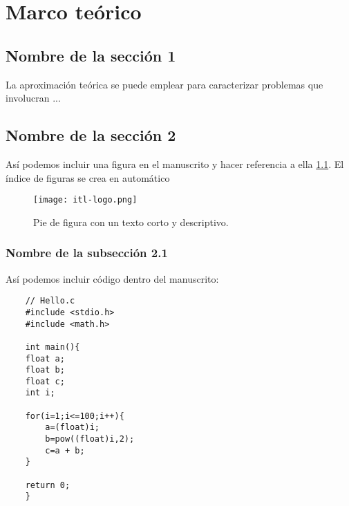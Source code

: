 \chapter{Marco teórico}

\section{Nombre de la sección 1}
La aproximación teórica \cite{Bloomfield1935} se puede emplear para caracterizar problemas que involucran \cite{Traugott1990}...

\section{Nombre de la sección 2}
Así podemos incluir una figura en el manuscrito y hacer referencia a ella \ref{Fig:01}. El índice de figuras se crea en automático

\begin{figure}[htp!]
	\centering
	\texttt{[image: itl-logo.png]}
	\caption{Pie de figura con un texto corto y descriptivo.}
	\label{Fig:01}
\end{figure}

\subsection{Nombre de la subsección 2.1}
Así podemos incluir código dentro del manuscrito:\\
\begin{lstlisting}
	// Hello.c
	#include <stdio.h>
	#include <math.h>
	
	int main(){
	float a;
	float b;
	float c;	
	int i;
	
	for(i=1;i<=100;i++){
		a=(float)i;
		b=pow((float)i,2);		
		c=a + b;
	}

	return 0;
    }
\end{lstlisting}

